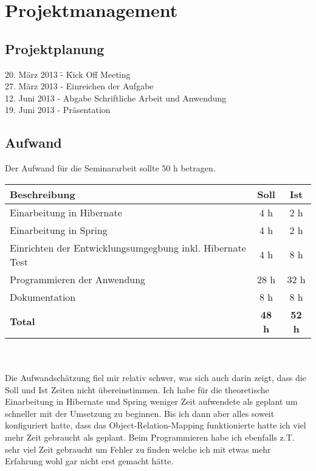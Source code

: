 \chapter{Projektmanagement}
\label{chap:Projektmanagement}

\section{Projektplanung}
\begin{tabbing}
20. März 2013	\= -	\= Kick Off Meeting	\\
27. März 2013	\> -	\> Einreichen der Aufgabe \\
12. Juni 2013	\> -	\> Abgabe Schriftliche Arbeit und Anwendung	\\
19. Juni 2013	\> -	\> Präsentation	\\
\end{tabbing}


\section{Aufwand}
Der Aufwand für die Seminararbeit sollte 50 h betragen. \\

\begin{tabular}{|l|c|c|}
\hline 
\textbf{Beschreibung} & \textbf{Soll}& \textbf{Ist} \\ 
\hline 
Einarbeitung in Hibernate & 4 h & 2 h \\ 
\hline 
Einarbeitung in Spring & 4 h & 2 h \\ 
\hline 
Einrichten der Entwicklungsumgegbung inkl. Hibernate Test & 4 h & 8 h \\ 
\hline 
Programmieren der Anwendung & 28 h & 32 h \\ 
\hline
Dokumentation & 8 h & 8 h \\ 
\hline 
\textbf{Total} & \textbf{48 h} & \textbf{52 h} \\
\hline
\end{tabular}
\\\\
Die Aufwandschätzung fiel mir relativ schwer, was sich auch darin zeigt, dass die Soll und Ist Zeiten nicht übereinstimmen. Ich habe für die theoretische Einarbeitung in Hibernate und Spring weniger Zeit aufwendete als geplant um schneller mit der Umsetzung zu beginnen. Bis ich dann aber alles soweit konfiguriert hatte, dass das Object-Relation-Mapping funktionierte hatte ich viel mehr Zeit gebraucht als geplant. Beim Programmieren habe ich ebenfalls z.T. sehr viel Zeit gebraucht um Fehler zu finden welche ich mit etwas mehr Erfahrung wohl gar nicht erst gemacht hätte.

